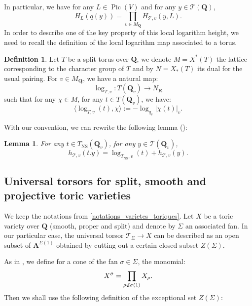 \documentclass{proc-l}
\newcommand{\R}{\mathbf{R}}
\newcommand{\Q}{\mathbf{Q}}
\DeclareMathOperator{\Pic}{Pic}
\DeclareMathOperator{\NS}{NS}
\newcommand{\stackT}{\mathcal{T}}
\newcommand{\affine}{\mathbf{A}}
\newtheorem{lemma}[theorem]{Lemma}
\theoremstyle{definition}
\newtheorem{definition}[theorem]{Definition}
\theoremstyle{remark}
\numberwithin{equation}{section}
\begin{document}
In particular, we have for any $L \in \Pic(V)$ and for any $y \in \stackT(\Q)$,
\begin{equation}\label{local_height_global_height}
     H_L(q(y)) = \prod\limits_{v \in M_{\Q}} H_{\stackT,v}(y,L) .
\end{equation}
In order to describe one of the key property of this local logarithm height, we need to recall the definition of the local logarithm map associated to a torus.

 \begin{definition}
    Let $T$ be a split torus over $\Q$, we denote $M = X^*(T)$ the lattice corresponding to the character group of $T$ and by $N = X_*(T)$ its dual for the usual pairing. For $v \in M_{\Q}$, we have a natural map:
    $$\log_{T,v} : T({\Q}_v) \rightarrow N_{\R}$$such that for any $\chi \in M$, for any $t \in T({\Q}_v)$, we have: $$ \langle \log_{T,v}(t) , \chi \rangle := - \log_{q_v} \left| \chi(t) \right|_v .$$
 \end{definition}

With our convention, we can rewrite the following lemma (\cite[lemma 4.30]{Peyre_beyond_height}):

\begin{lemma}\label{hauteur_locale_torseur_univ_et_action_de_tns}
    For any $t \in T_{\NS}({\Q}_v)$, for any $y \in \stackT({\Q}_v)$,
    $$h_{\stackT,v}(t.y) = \log_{T_{\NS},v}(t) + h_{\stackT,v}(y) .$$
\end{lemma}




\subsection{Universal torsors for split, smooth and projective toric varieties}\label{subsection_univ_torsor_toric_varieties}




We keep the notations from \ref{notations_varietes_toriques}. Let $X$ be a toric variety over $\Q$ (smooth, proper and split) and denote by $\Sigma$ an associated fan. In our particular case, the universal torsor $\stackT_{\Sigma} \rightarrow X$ can be described as an open subset of $\affine^{\Sigma(1)}$ obtained by cutting out a certain closed subset $Z(\Sigma)$.

As in \cite[chapter 5, §1]{CoxLittleSchenck2011}, we define for a cone of the fan $\sigma \in \Sigma$, the monomial:
$$ X^{\Tilde{\sigma}} = \prod\limits_{\rho \not\in \sigma(1)} X_{\rho} .$$Then we shall use the following definition of the exceptional set $Z(\Sigma)$:
\end{document}
